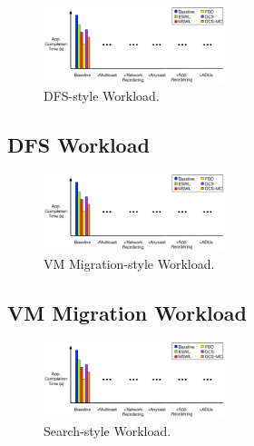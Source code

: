 \begin{figure}[t!!!]
\centering
\includegraphics[width=0.47\textwidth]{figures/eval/map_red}
\caption{DFS-style Workload.}
\label{fig:eval_DFS}
\end{figure}

\subsection{DFS Workload}
\label{sec:eval_DFS}






\newpage\phantom{t}
\begin{figure}[t!!!]
\centering
\includegraphics[width=0.47\textwidth]{figures/eval/map_red}
\caption{VM Migration-style Workload.}
\label{fig:eval_VM}
\end{figure}

\subsection{VM Migration Workload}
\label{sec:eval_VM}








\begin{figure}[t!!!]
\centering
\includegraphics[width=0.47\textwidth]{figures/eval/map_red}
\caption{Search-style Workload.}
\label{fig:eval_search}
\end{figure}

